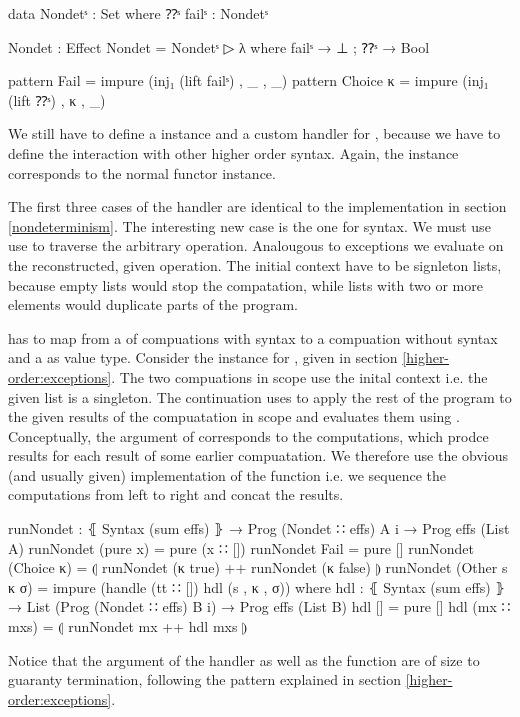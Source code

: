 \begin{code}[hide]
data Nondetˢ : Set where ⁇ˢ failˢ : Nondetˢ
\end{code}
\begin{code}
Nondet : Effect
Nondet = Nondetˢ ▷ λ where failˢ → ⊥ ; ⁇ˢ → Bool

pattern Fail      = impure (inj₁ (lift failˢ)  , _ , _)
pattern Choice κ  = impure (inj₁ (lift ⁇ˢ)     , κ , _)
\end{code}
We still have to define a  instance and a custom handler
for , because we have to define the interaction with other
higher order syntax.
Again, the  instance corresponds to the normal functor
instance.

The first three cases of the handler are identical to the implementation in
section \ref{nondeterminism}.
The interesting new case is the one for  syntax.
We must use use  to traverse the arbitrary operation.
Analougous to exceptions we evaluate  on the reconstructed,
given operation.
The initial context have to be signleton lists, because empty lists would
stop the compatation, while lists with two or more elements would duplicate
parts of the program.

 has to map from a  of compuations with
 syntax to a compuation without 
syntax and a  as value type.
Consider the  instance for , given in
section \ref{higher-order:exceptions}.
The two compuations in scope use the inital context i.e. the given list is a
singleton.
The continuation uses \AgdaFunction{<\$>} to apply the rest of the program to
the given results of the compuatation in scope and evaluates them using
.
Conceptually, the argument of  corresponds to the
computations, which prodce results for each result of some earlier compuatation.
We therefore use the obvious (and usually given) implementation of the
 function i.e. we sequence the computations from left to right
and concat the results.

\begin{code}
runNondet : ⦃ Syntax (sum effs) ⦄ → Prog (Nondet ∷ effs) A {i} → Prog effs (List A)
runNondet (pure x)       = pure (x ∷ [])
runNondet Fail           = pure []
runNondet (Choice κ)     = ⦇ runNondet (κ true) ++ runNondet (κ false) ⦈
runNondet (Other s κ σ)  = impure (handle (tt ∷ []) hdl (s , κ , σ))
  where  hdl : ⦃ Syntax (sum effs) ⦄ →
           List (Prog (Nondet ∷ effs) B {i}) → Prog effs (List B)
         hdl []          = pure []
         hdl (mx ∷ mxs)  = ⦇ runNondet mx ++ hdl mxs ⦈
\end{code}
Notice that the argument of the handler as well as the 
function are of size  to guaranty termination, following the
pattern explained in section \ref{higher-order:exceptions}.

